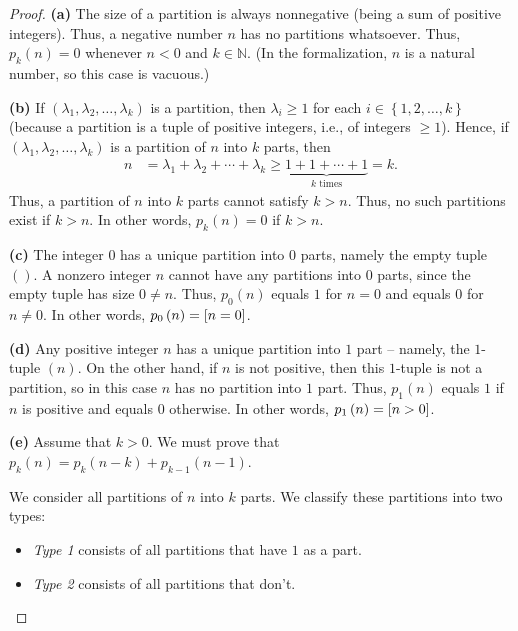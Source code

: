 \begin{proof}
\textbf{(a)} The size
of a partition is always nonnegative (being a sum of positive integers). Thus,
a negative number $n$ has no partitions whatsoever. Thus, $p_{k}\left(
n\right)  =0$ whenever $n<0$ and $k\in\mathbb{N}$.
(In the formalization, $n$ is a natural number, so this case is vacuous.) \medskip

\textbf{(b)} If $\left(  \lambda_{1},\lambda_{2},\ldots,\lambda_{k}\right)  $
is a partition, then $\lambda_{i}\geq1$ for each $i\in\left\{  1,2,\ldots
,k\right\}  $ (because a partition is a tuple of positive integers, i.e., of
integers $\geq1$). Hence, if $\left(  \lambda_{1},\lambda_{2},\ldots
,\lambda_{k}\right)  $ is a partition of $n$ into $k$ parts, then%
\begin{align*}
n  &  =\lambda_{1}+\lambda_{2}+\cdots+\lambda_{k}\geq\underbrace{1+1+\cdots+1}_{k\text{ times}}=k.
\end{align*}
Thus, a partition of $n$ into $k$ parts cannot satisfy $k>n$. Thus, no such
partitions exist if $k>n$. In other words, $p_{k}\left(  n\right)  =0$ if
$k>n$. \medskip

\textbf{(c)} The integer $0$ has a unique partition into $0$ parts, namely the
empty tuple $\left(  {}\right)  $. A nonzero integer $n$ cannot have any
partitions into $0$ parts, since the empty tuple has size $0\neq n$. Thus,
$p_{0}\left(  n\right)  $ equals $1$ for $n=0$ and equals $0$ for $n\neq0$. In
other words, $p_{0}\left(  n\right)  =\left[ n=0 \right]$. \medskip

\textbf{(d)} Any positive integer $n$ has a unique partition into $1$ part --
namely, the $1$-tuple $\left(  n\right)  $. On the other hand, if $n$ is not
positive, then this $1$-tuple is not a partition, so in this case $n$ has no
partition into $1$ part. Thus, $p_{1}\left(  n\right)  $ equals $1$ if $n$ is
positive and equals $0$ otherwise. In other words, $p_{1}\left(  n\right)
=\left[ n>0 \right]$. \medskip

\textbf{(e)} Assume that $k>0$. We must prove that $p_{k}\left(  n\right)
=p_{k}\left(  n-k\right)  +p_{k-1}\left(  n-1\right)  $.

We consider all partitions of $n$ into $k$ parts. We classify these partitions
into two types:

\begin{itemize}
\item \emph{Type 1} consists of all partitions that have $1$ as a part.

\item \emph{Type 2} consists of all partitions that don't.
\end{itemize}


\end{proof}
